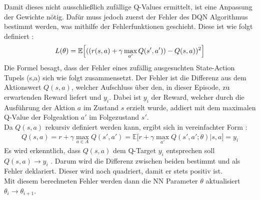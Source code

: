 Damit dieses nicht ausschließlich zufällige Q-Values ermittelt, ist eine Anpassung der Gewichte nötig. Dafür muss jedoch zuerst der Fehler des DQN Algorithmus bestimmt werden, was mithilfe der Fehlerfunktionen geschieht. Diese ist wie folgt definiert \citep[S.146 f.]{DRL_Lapan}:
\begin{align}
	L(\theta) = \mathbb{E} \Bigl\lbrack ((r(s,a) +\gamma \max_{a'}Q(s',a')) - Q(s,a))^2 \Bigr\rbrack
	\label{eq:DQN_Loss}
\end{align}
Die Formel  besagt, dass der Fehler eines zufällig ausgesuchten State-Action Tupels (s,a) sich wie folgt zusammensetzt. 
Der Fehler ist die Differenz aus dem Aktionswert $Q(s,a)$, welcher Aufschluss über den, in dieser Episode, zu erwartenden Reward liefert und $y_i$. Dabei ist $y_i$ der Reward, welcher durch die Ausführung der Aktion $a$ im Zustand $s$ erzielt wurde, addiert mit dem maximalen Q-Value der Folgeaktion $a'$ im Folgezustand $s'$.\\
Da $Q(s,a)$ rekursiv definiert werden kann, ergibt sich in vereinfachter Form \citep[S.126 und S. 146 f.]{DRL_Lapan}:
\begin{align}
	Q(s,a) = r + \gamma \max_{a \in A}Q(s',a') = \mathbb{E} \bigl\lbrack r+\gamma \max_{a'}Q(s',a';\theta)|s,a \bigr\rbrack = y_i
	\label{eq:Q-Value_rekursive_def}
\end{align}
Es wird erkenntlich, dass $Q(s,a)$ dem Q-Target $y_i$ entsprechen soll $Q(s,a) \longrightarrow y_i$ . Darum wird die Differenz zwischen beiden bestimmt und als Fehler deklariert. Dieser wird noch quadriert, damit er stets positiv ist. \\
Mit diesem berechneten Fehler werden dann die NN Parameter $\theta$ aktualisiert $\theta_{i} \longrightarrow \theta_{i+1}$.

